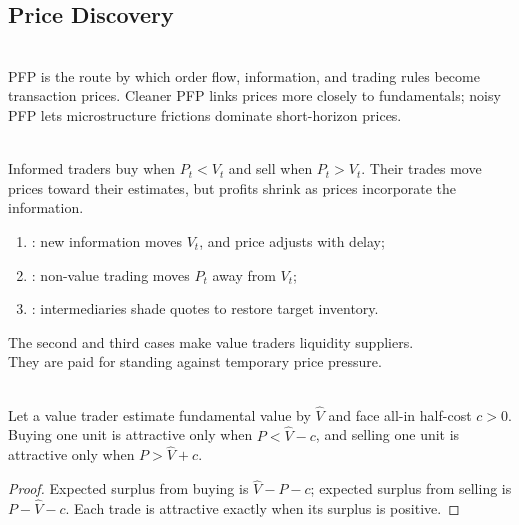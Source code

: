 \subsection{Price Discovery}

\begin{definition} \\
PFP is the route by which order flow, information, and trading rules become transaction prices. Cleaner PFP links prices more closely to fundamentals; noisy PFP lets microstructure frictions dominate short-horizon prices.
\end{definition}

\begin{mechanism} \\
Informed traders buy when $P_t<V_t$ and sell when $P_t>V_t$. Their trades move prices toward their estimates, but profits shrink as prices incorporate the information.
\end{mechanism}

\begin{taxonomy} 
\begin{enumerate}[label=\roman*.]
\setlength{\itemsep}{0pt}
\item {}: new information moves $V_t$, and price adjusts with delay;
\item {}: non-value trading moves $P_t$ away from $V_t$;
\item {}: intermediaries shade quotes to restore target inventory.
\end{enumerate}
The second and third cases make value traders liquidity suppliers.\\
They are paid for standing against temporary price pressure.
\end{taxonomy}

\begin{proposition} \\
Let a value trader estimate fundamental value by $\widehat{V}$ and face all-in half-cost $c>0$. Buying one unit is attractive only when $P<\widehat{V}-c$, and selling one unit is attractive only when $P>\widehat{V}+c$.
\begin{proof}
Expected surplus from buying is $\widehat{V}-P-c$; expected surplus from selling is $P-\widehat{V}-c$. Each trade is attractive exactly when its surplus is positive.
\end{proof}
\end{proposition}

